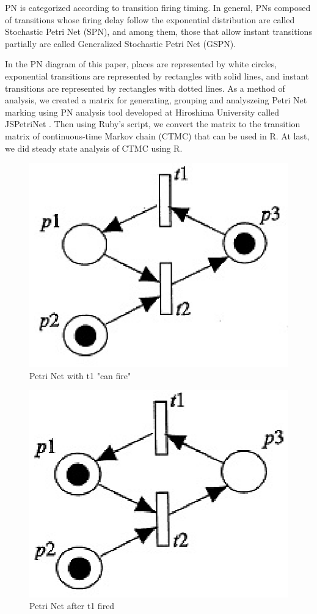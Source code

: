 PN is categorized according to transition firing timing.
In general, PNs composed of transitions whose firing delay follow the exponential distribution are called Stochastic Petri Net (SPN), and among them, those that allow instant transitions partially are called Generalized Stochastic Petri Net (GSPN).

In the PN diagram of this paper, places are represented by white circles, exponential transitions are represented by rectangles with solid lines, and instant transitions are represented by rectangles with dotted lines.
As a method of analysis, we created a matrix for generating, grouping and analyszeing Petri Net marking using PN analysis tool developed at Hiroshima University called JSPetriNet \cite{siryo2}.
Then using Ruby's script, we convert the matrix to the transition matrix of continuous-time Markov chain (CTMC) that can be used in R.
At last, we did steady state analysis of CTMC using R.


\begin{figure}[p]
\begin{center}
	\includegraphics[]{fig/2-1.eps}
\end{center}
\caption{Petri Net with t1 "can fire"}
\label{fig:2-1}
\end{figure}


\begin{figure}[p]
\begin{center}
	\includegraphics[]{fig/2-2.eps}
\end{center}
\caption{Petri Net after t1 fired}
\label{fig:2-2}
\end{figure}

